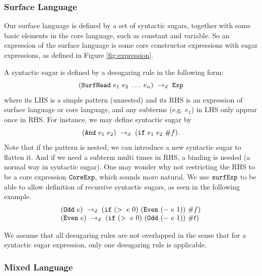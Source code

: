 \subsubsection{Surface Language}

Our surface language is defined by a set of syntactic sugars, together with some basic elements in the core language, such as constant and variable. So an expression of the surface language is some core constructor expressions with sugar expressions, as defined in Figure \ref{fig:expression}.

A syntactic sugar is defined by a desugaring rule in the following form:
\[
(\mbox{\tt SurfHead}~e_1~e_2~\ldots~e_n) ~\rightarrow_d~ \mbox{\tt Exp}
\]
where its LHS is a simple pattern (unnested) and its RHS is an expression of surface language or core language, and any subterms (e.g. $e_1$) in LHS only appear once in RHS. For instance, we may define syntactic sugar  by
\[
(\mbox{\tt And}~e_1~e_2) ~\rightarrow_d~ (\mbox{\tt if}~e_1~e_2~\#f).
\]
Note that if the pattern is nested, we can introduce a new syntactic sugar to flatten it. And if we need a subterm multi times in RHS, a  binding is needed (a normal way in syntactic sugar).
One may wonder why  not restricting the RHS to be a core expression $\mbox{\tt CoreExp}$, which sounds more natural. We use $\mbox{\tt surfExp}$ to be able to allow definition of recursive syntactic sugars, as seen in the following example.
\[
\begin{array}{l}
(\mbox{\tt Odd}~e) ~\rightarrow_d~ (\mbox{\tt if}~(>~e~0)~(\mbox{\tt Even}~(-~e~1))~\#f)\\
(\mbox{\tt Even}~e) ~\rightarrow_d~ (\mbox{\tt if}~(>~e~0)~(\mbox{\tt Odd}~(-~e~1))~\#t)
\end{array}
\]

We assume that all desugaring rules are not overlapped in the sense that for a syntactic sugar expression, only one desugaring rule is applicable.


\subsubsection{Mixed Language}

